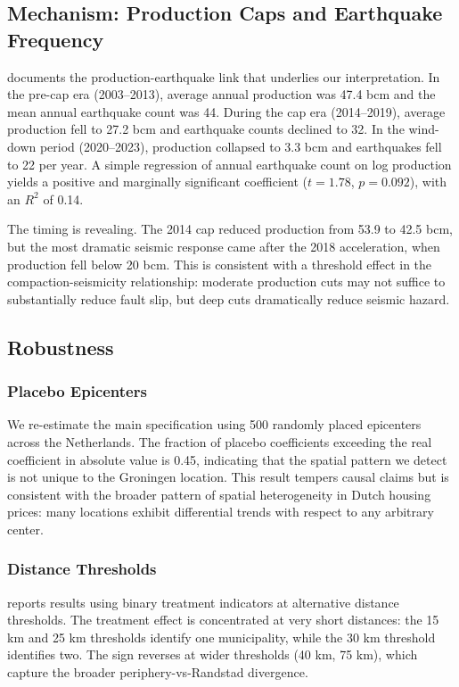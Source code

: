 \documentclass[12pt]{article}
\begin{document}


\subsection{Mechanism: Production Caps and Earthquake Frequency}

 documents the production-earthquake link that underlies our interpretation. In the pre-cap era (2003--2013), average annual production was 47.4 bcm and the mean annual earthquake count was 44. During the cap era (2014--2019), average production fell to 27.2 bcm and earthquake counts declined to 32. In the wind-down period (2020--2023), production collapsed to 3.3 bcm and earthquakes fell to 22 per year. A simple regression of annual earthquake count on log production yields a positive and marginally significant coefficient ($t = 1.78$, $p = 0.092$), with an $R^2$ of 0.14.

The timing is revealing. The 2014 cap reduced production from 53.9 to 42.5 bcm, but the most dramatic seismic response came after the 2018 acceleration, when production fell below 20 bcm. This is consistent with a threshold effect in the compaction-seismicity relationship: moderate production cuts may not suffice to substantially reduce fault slip, but deep cuts dramatically reduce seismic hazard.



\subsection{Robustness}

\subsubsection*{Placebo Epicenters} We re-estimate the main specification using 500 randomly placed epicenters across the Netherlands. The fraction of placebo coefficients exceeding the real coefficient in absolute value is 0.45, indicating that the spatial pattern we detect is not unique to the Groningen location. This result tempers causal claims but is consistent with the broader pattern of spatial heterogeneity in Dutch housing prices: many locations exhibit differential trends with respect to any arbitrary center.

\subsubsection*{Distance Thresholds}  reports results using binary treatment indicators at alternative distance thresholds. The treatment effect is concentrated at very short distances: the 15 km and 25 km thresholds identify one municipality, while the 30 km threshold identifies two. The sign reverses at wider thresholds (40 km, 75 km), which capture the broader periphery-vs-Randstad divergence.
\end{document}
